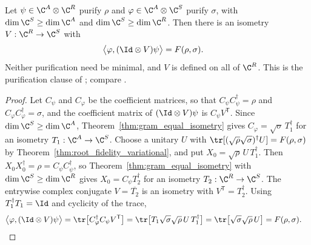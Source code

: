 \begin{theorem}
    \label{thm:uhlmann_isometry}
    \leanok
    Let $\psi\in\C^{A}\otimes\C^{R}$ purify $\rho$ and
    $\varphi\in\C^{A}\otimes\C^{S}$ purify $\sigma$, with
    $\dim\C^S\ge\dim\C^A$ and $\dim\C^S\ge\dim\C^R$. Then there is an
    isometry $V:\C^R\to\C^S$ with
    \begin{align}
        \bigl\langle\varphi,(\Id\otimes V)\psi\bigr\rangle
         & =F(\rho,\sigma).
        \label{eq:uhlmann_isometry}
    \end{align}
    Neither purification need be minimal, and $V$ is defined on all of
    $\C^R$. This is the purification clause of
    \cite[Lemma~2.2]{OpenAI2026PolynomialPEPS}; compare
    \cite[Sections~2 and~5]{Uhlmann1976}.
\end{theorem}

\begin{proof}\leanok
    Let $C_\psi$ and $C_\varphi$ be the coefficient matrices, so that
    $C_\psi C_\psi^\dagger=\rho$ and $C_\varphi C_\varphi^\dagger=\sigma$,
    and the coefficient matrix of $(\Id\otimes V)\psi$ is
    $C_\psi V^{\mathsf T}$. Since $\dim\C^S\ge\dim\C^A$,
    Theorem~\ref{thm:gram_equal_isometry} gives
    $C_\varphi=\sqrt\sigma\,T_1^\dagger$ for an isometry
    $T_1:\C^A\to\C^S$. Choose a unitary $U$ with
    $\tr[(\sqrt\rho\sqrt\sigma)^\dagger U]=F(\rho,\sigma)$ by
    Theorem~\ref{thm:root_fidelity_variational}, and put
    $X_0=\sqrt\rho\,U\,T_1^\dagger$. Then
    $X_0X_0^\dagger=\rho=C_\psi C_\psi^\dagger$, so
    Theorem~\ref{thm:gram_equal_isometry} with $\dim\C^S\ge\dim\C^R$
    gives $X_0=C_\psi T_2^\dagger$ for an isometry $T_2:\C^R\to\C^S$.
    The entrywise complex conjugate $V=\overline{T_2}$ is an isometry with
    $V^{\mathsf T}=T_2^\dagger$. Using $T_1^\dagger T_1=\Id$ and
    cyclicity of the trace,
    \begin{align}
        \bigl\langle\varphi,(\Id\otimes V)\psi\bigr\rangle
         & =\tr\bigl[C_\varphi^\dagger C_\psi V^{\mathsf T}\bigr]
        =\tr\bigl[T_1\sqrt\sigma\sqrt\rho\,U\,T_1^\dagger\bigr]
        =\tr\bigl[\sqrt\sigma\sqrt\rho\,U\bigr]
        =F(\rho,\sigma).
        \notag
    \end{align}
\end{proof}

